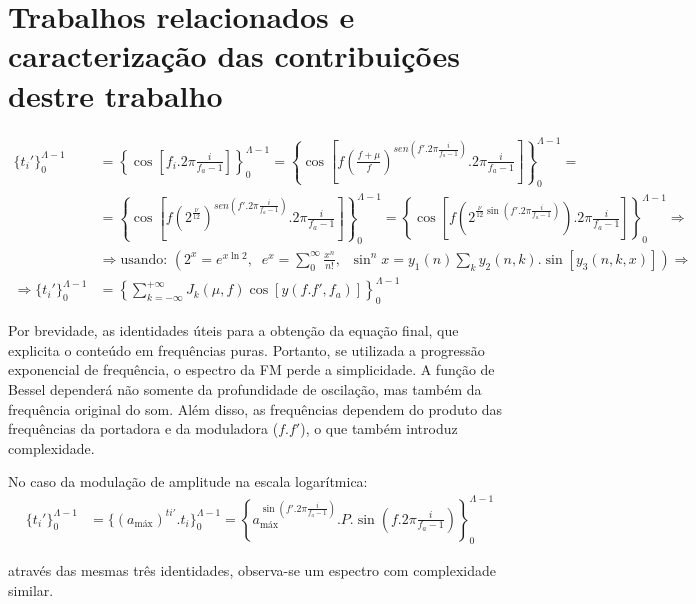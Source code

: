 \chapter{Trabalhos relacionados e caracterização das contribuições destre trabalho}
\label{cap:trabalhosRelacionados}

\begin{equation}
\begin{split}
\{t_i'\}_0^{\Lambda -1} &  = \left \{ \cos \left [f_i . 2 \pi \frac{i}{f_a-1} \right ] \right \}_0^{\Lambda-1}  = \left \{ \cos \left [f\left ( \frac{f+\mu}{f} \right )^{sen \left ( f' . 2 \pi \frac{i}{ f_a -1 } \right )} . 2 \pi \frac{i}{f_a-1} \right ] \right \}_0^{\Lambda-1}  =  \\
 & = \left \{ \cos \left [f\left ( 2^{\frac{\nu}{12}} \right )^{sen \left ( f' . 2 \pi \frac{i}{ f_a -1 } \right )} . 2 \pi \frac{i}{f_a-1} \right ] \right \}_0^{\Lambda-1} =\left \{ \cos \left [f\left ( 2^{\frac{\nu}{12} \sin \left ( f' . 2 \pi \frac{i}{ f_a -1 } \right )  } \right ) . 2 \pi \frac{i}{f_a-1} \right ] \right \}_0^{\Lambda-1} \Rightarrow \\
& \Rightarrow \text{usando: } \left ( 2^x=e^{x \ln 2}, \;\; e^x=\sum_0^\infty \frac{x^n}{n!},\;\; \sin^nx=y_1(n)\sum_k y_2(n,k).\sin[y_3(n,k,x)]   \right ) \Rightarrow \\
\Rightarrow \{t_i'\}_0^{\Lambda -1} & = \left \{ \sum_{k=-\infty}^{+\infty} J_k(\mu,f) \cos \left [ y(f.f', f_a) \right ]  \right \}_0^{\Lambda-1}
\end{split}
\end{equation}

Por brevidade, as identidades úteis para a obtenção
da equação final, que explicita o conteúdo em frequências puras.
Portanto, se utilizada a progressão exponencial de frequência,
o espectro da FM perde a simplicidade.
A função de Bessel dependerá não somente da profundidade de oscilação,
mas também da frequência original do som. Além disso, as frequências dependem do produto das frequências
da portadora e da moduladora ($f.f'$), o que também introduz complexidade.

No caso da modulação de amplitude na escala logarítmica:
\begin{equation}\label{eq:am}
\begin{split}
\{t_i'\}_0^{\Lambda-1} & =\{(a_{\text{máx}})^{ti'} . t_i\}_0^{\Lambda-1}= \left \{ a_{\text{máx}}^{\sin \left ( f'.2\pi\frac{i}{f_a -1} \right )} . P .\sin \left ( f.2\pi\frac{i}{f_a -1} \right ) \right \}_0^{\Lambda-1} 
\end{split}
\end{equation}

através das mesmas três identidades, observa-se um espectro com complexidade similar.

